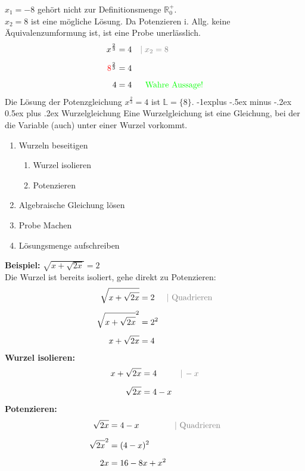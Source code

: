 \documentclass[10pt,landscape]{article}
\makeatletter
\renewcommand{\subsection}{\@startsection{subsection}{2}{0mm}%
                                {-1explus -.5ex minus -.2ex}%
                                {0.5ex plus .2ex}%
                                {\normalfont\normalsize\bfseries}}
\makeatother
\begin{document}
\begin{multicols}{3}
    $x_1 = -8$ gehört nicht zur Definitionsmenge $\mathbb{R}_{0}^{+}$.\\
    $x_2 = 8$ ist eine mögliche Lösung. Da Potenzieren i. Allg. keine Äquivalenzumformung ist, ist eine Probe unerlässlich.
    \begin{align*} x^{\frac{2}{3}} &= 4 &&{\color{gray}|\; x_2 = 8} \\[5px] {\color{red}8}^{\frac{2}{3}} &= 4 \\[5px] 4 &= 4 &&{\color{green}\phantom{|} \text{ Wahre Aussage!}} \end{align*}
    Die Lösung der Potenzgleichung $x^{\frac{2}{3}} = 4$ ist $\mathbb{L} = \{8\}$.
    \subsection{Wurzelgleichung}
    Eine Wurzelgleichung ist eine Gleichung, bei der die Variable (auch) unter einer Wurzel vorkommt. \\
    \begin{enumerate}
        \item Wurzeln beseitigen
              \begin{enumerate}
                  \item Wurzel isolieren
                  \item Potenzieren
              \end{enumerate}
        \item Algebraische Gleichung lösen
        \item Probe Machen
        \item Lösungsmenge aufschreiben
    \end{enumerate}
    \textbf{Beispiel:} $\sqrt{x + \sqrt{2x}} = 2$ \\
    Die Wurzel ist bereits isoliert, gehe direkt zu Potenzieren:
    \begin{align*} \sqrt{x + \sqrt{2x}} &= 2 &&{\color{gray}| \text{ Quadrieren}} \\[5px] \sqrt{x + \sqrt{2x}}^2 &= 2^2 \\[5px] x + \sqrt{2x} &= 4 \end{align*}
    \textbf{Wurzel isolieren:}
    \begin{align*} x + \sqrt{2x} &= 4 &&{\color{gray}|\, -x} \\[5px] \sqrt{2x} &= 4 - x \end{align*}
    \textbf{Potenzieren:}
    \begin{align*} \sqrt{2x} &= 4 - x &&{\color{gray}| \text{ Quadrieren}} \\[5px] \sqrt{2x}^2 &= (4 - x)^2 \\[5px] 2x &= 16 - 8x + x^2 \end{align*}

\end{multicols}
\end{document}
